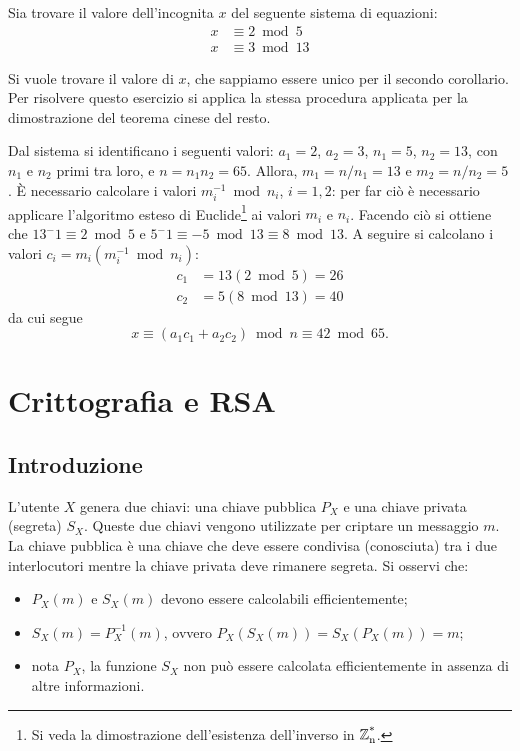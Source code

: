 \begin{esempio}
Sia trovare il valore dell'incognita $x$ del seguente sistema di equazioni:
\begin{align*}
 x &\equiv 2\bmod 5 \\
 x &\equiv 3\bmod 13
\end{align*}

Si vuole trovare il valore di $x$, che sappiamo essere unico per il secondo corollario. Per risolvere questo esercizio si applica la stessa procedura applicata per la dimostrazione del teorema cinese del resto. 

Dal sistema si identificano i seguenti valori: $a_1=2$, $a_2=3$, $n_1=5$, $n_2=13$, con $n_1$ e $n_2$ primi tra loro, e $n=n_1n_2=65$.
Allora, $m_1=n/n_1=13$ e $m_2=n/n_2=5$. È necessario calcolare i valori $m_i^{-1}\bmod n_i$, $i=1,2$: per far ciò è necessario applicare l'algoritmo esteso di Euclide\footnote{Si veda la dimostrazione dell'esistenza dell'inverso in $\operatorname*{\mathbb{Z}_n^*}$.} ai valori $m_i$ e $n_i$. Facendo ciò si ottiene che $13^-1 \equiv 2\bmod 5$ e $5^-1 \equiv -5\bmod 13 \equiv 8\bmod 13$. A seguire si calcolano i valori $c_i = m_i(m_i^{-1}\bmod n_i)$:
\begin{align*}
 c_1 &= 13(2\bmod 5)=26 \\
 c_2 &= 5(8\bmod 13)=40 
\end{align*}
da cui segue
\[
 x\equiv (a_1c_1 + a_2c_2)\bmod n \equiv 42\bmod 65.
\]
\end{esempio}

\section{Crittografia e RSA}
\subsection{Introduzione}
L'utente $X$ genera due chiavi: una chiave pubblica $P_X$ e una chiave privata (segreta) $S_X$. Queste due chiavi vengono utilizzate per criptare un messaggio $m$. La chiave pubblica è una chiave che deve essere condivisa (conosciuta) tra i due interlocutori mentre la chiave privata deve rimanere segreta. Si osservi che:
\begin{itemize}
\item $P_X(m)$ e $S_X(m)$ devono essere calcolabili efficientemente;
\item $S_X(m)=P_X^{-1}(m)$, ovvero $P_X(S_X(m))=S_X(P_X(m))=m$;
\item nota $P_X$, la funzione $S_X$ non può essere calcolata efficientemente in assenza di altre informazioni.
\end{itemize}


